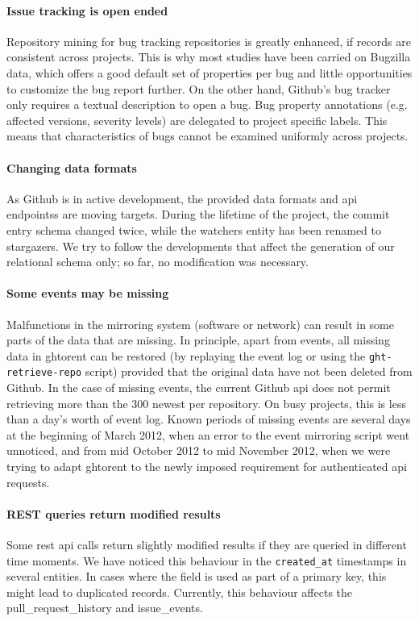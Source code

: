 \documentclass[conference]{IEEEtran}
\begin{document}
\paragraph*{Issue tracking is open ended} Repository mining for bug tracking
    repositories is greatly enhanced, if records are consistent across
    projects. This is why most studies have been carried on Bugzilla data, which
    offers a good default set of properties per bug and little opportunities to
    customize the bug report further. On the other hand, Github's bug tracker
    only requires a textual description to open a bug. Bug property annotations
    (e.g. affected versions, severity levels) are delegated to project specific
    labels. This means that characteristics of bugs cannot be
    examined uniformly across projects.

\paragraph*{Changing data formats} As Github is in active development, the
provided data formats and {\sc api} endpointss are moving targets. During the
lifetime of the project, the commit entry schema changed twice, while the
\textsf{watchers} entity has been renamed to \textsf{stargazers}. We try to
follow the developments that affect the generation of our relational schema
only; so far, no modification was necessary.

\paragraph*{Some events may be missing} Malfunctions in the mirroring system
    (software or network) can result in some parts of the data that are missing.
    In principle, apart from events, all missing data in {\sc ght}orent can be
    restored (by replaying the event log or using the \texttt{ght-retrieve-repo}
    script) provided that the original data have not been deleted from Github.
    In the case of missing events, the current Github {\sc api} does not permit
    retrieving more than the 300 newest per repository. On busy projects, this
    is less than a day's worth of event log. Known periods of missing events are
    several days at the beginning of March 2012, when an error to the event
    mirroring script went unnoticed, and from mid October 2012 to mid November
    2012, when we were trying to adapt {\sc ght}orent to the newly imposed
    requirement for authenticated {\sc api} requests.

\paragraph*{REST queries return modified results} Some {\sc rest api} calls
return slightly modified results if they are queried in different time 
moments. We have noticed this behaviour in the \texttt{created\_at} 
timestamps in several entities. In cases where the field is used as part
of a primary key, this might lead to duplicated records. Currently, this 
behaviour affects the \textsf{pull\_request\_history} and
\textsf{issue\_events}.
\end{document}
